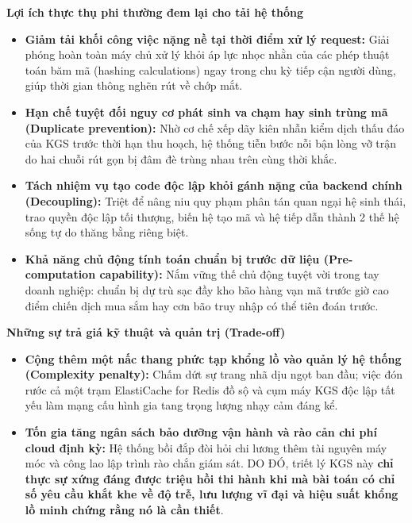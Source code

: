 \vspace{0.5em}\noindent\textbf{Lợi ích thực thụ phi thường đem lại cho tải hệ
thống}\par

\begin{itemize}
\tightlist
\item
  \textbf{Giảm tải khối công việc nặng nề tại thời điểm xử lý request:}
  Giải phóng hoàn toàn máy chủ xử lý khỏi áp lực nhọc nhằn của các phép
  thuật toán băm mã (hashing calculations) ngay trong chu kỳ tiếp cận
  người dùng, giúp thời gian thông nghẽn rút về chớp mắt.
\item
  \textbf{Hạn chế tuyệt đối nguy cơ phát sinh va chạm hay sinh trùng mã
  (Duplicate prevention):} Nhờ cơ chế xếp dãy kiên nhẫn kiểm dịch thấu
  đáo của KGS trước thời hạn thu hoạch, hệ thống tiễn bước nỗi bận lòng
  vỡ trận do hai chuỗi rút gọn bị đâm đè trùng nhau trên cùng thời khắc.
\item
  \textbf{Tách nhiệm vụ tạo code độc lập khỏi gánh nặng của backend
  chính (Decoupling):} Triệt để nâng niu quy phạm phân tán quan ngại hệ
  sinh thái, trao quyền độc lập tối thượng, biến hệ tạo mã và hệ tiếp
  dẫn thành 2 thế hệ sống tự do thăng bằng riêng biệt.
\item
  \textbf{Khả năng chủ động tính toán chuẩn bị trước dữ liệu
  (Pre-computation capability):} Nắm vững thế chủ động tuyệt vời trong
  tay doanh nghiệp: chuẩn bị dự trù sạc đầy kho bão hàng vạn mã trước
  giờ cao điểm chiến dịch mua sắm hay cơn bão truy nhập có thể tiên đoán
  trước.
\end{itemize}

\vspace{0.5em}\noindent\textbf{Những sự trả giá kỹ thuật và quản trị
(Trade-off)}\par

\begin{itemize}
\tightlist
\item
  \textbf{Cộng thêm một nấc thang phức tạp khổng lồ vào quản lý hệ thống
  (Complexity penalty):} Chấm dứt sự trang nhã dịu ngọt ban đầu; việc
  đón rước cả một trạm ElastiCache for Redis đồ sộ và cụm máy KGS độc
  lập tất yếu làm mạng cấu hình gia tang trọng lượng nhạy cảm đáng kể.
\item
  \textbf{Tốn gia tăng ngân sách bảo dưỡng vận hành và rào cản chi phí
  cloud định kỳ:} Hệ thống bồi đắp đòi hỏi chi lương thêm tài nguyên máy
  móc và công lao lập trình rào chắn giám sát. DO ĐÓ, triết lý KGS này
  \textbf{chỉ thực sự xứng đáng được triệu hồi thi hành khi mà bài toán
  có chỉ số yêu cầu khắt khe về độ trễ, lưu lượng vĩ đại và hiệu suất
  khổng lồ minh chứng rằng nó là cần thiết}.
\end{itemize}

